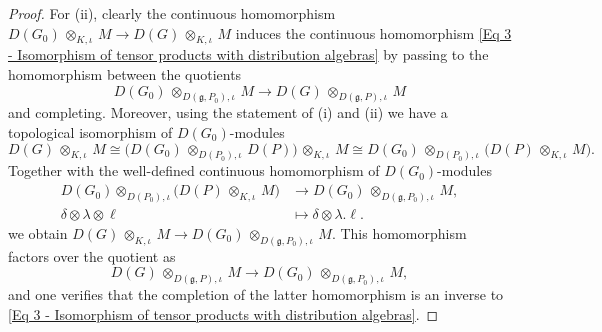\documentclass[a4paper, reqno, 10pt]{amsart}
\theoremstyle{definition}
\numberwithin{equation}{section}
\newcommand{\botimes}[1]{{\,\otimes_{#1}\,}}
\newcommand{\cotimes}[1]{{\,\widehat{\otimes}_{#1}\,}}
\newcommand{\indotimes}{{\,\otimes_{K,\iota}\,}}
\newcommand{\lra}{\longrightarrow}
\newcommand{\lto}{\longmapsto}
\newcommand{\projotimes}{{\,\otimes_{K,\pi}\,}}
\newcommand{\ra}{\rightarrow}
\newcommand{\Fg}{{\mathfrak {g}}}
\begin{document}
\begin{proof}
	
	For (ii), clearly the continuous homomorphism $D(G_0) \botimes{K,\iota} M  \ra D(G) \indotimes M$ induces the continuous homomorphism \eqref{Eq 3 - Isomorphism of tensor products with distribution algebras} by passing to the homomorphism between the quotients
	\begin{equation*}
		D(G_0) \botimes{D(\Fg, P_0),\iota} M \lra D(G) \botimes{D(\Fg, P),\iota} M
	\end{equation*}
	and completing.
	Moreover, using the statement of (i) and  (ii) we have a topological isomorphism of $D(G_0)$-modules
	\begin{equation*}
		D(G) \botimes{K,\iota} M  \cong \big( D(G_0) \botimes{D(P_0),\iota} D(P) \big) \indotimes M
		\cong  D(G_0) \botimes{D(P_0),\iota} \big( D(P)  \indotimes M \big) .
	\end{equation*}	
	Together with the well-defined continuous homomorphism of $D(G_0)$-modules
	\begin{align*}
		D(G_0) \otimes_{D(P_0),\iota} \big( D(P) \indotimes M \big) &\lra D(G_0) \botimes{D(\Fg,P_0),\iota} M,  \\
		\delta \otimes \lambda \otimes \ell   &\lto \delta \otimes  \lambda.\ell .
	\end{align*}	
	we obtain $D(G) \indotimes M \ra D(G_0) \botimes{D(\Fg,P_0),\iota} M$.
	This homomorphism factors over the quotient as
	\begin{equation*}
		D(G) \botimes{D(\Fg,P),\iota} M \lra D(G_0) \botimes{D(\Fg,P_0),\iota} M ,
	\end{equation*}
	and one verifies that the completion of the latter homomorphism is an inverse to \eqref{Eq 3 - Isomorphism of tensor products with distribution algebras}.	
\end{proof}
\end{document}
